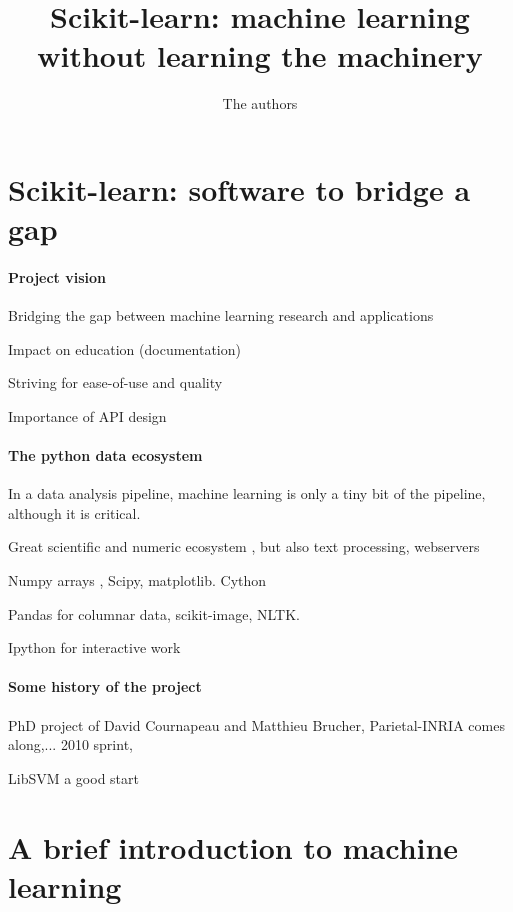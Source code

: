 \documentclass{article}
\begin{document}
\title{Scikit-learn: machine learning without learning the machinery}

\author{The authors}

\maketitle

\section{Scikit-learn: software to bridge a gap}

\paragraph{Project vision}
%
Bridging the gap between machine learning research and applications

\cite{pedregosa2011}

Impact on education (documentation)

Striving for ease-of-use and quality

Importance of API design \cite{buitinck2013ecml}

\paragraph{The python data ecosystem}
%
In a data analysis pipeline, machine learning is only a tiny bit of the
pipeline, although it is critical.

Great scientific and numeric ecosystem
\cite{oliphant2007python,varoquaux2013scipy}, but also text processing,
webservers

Numpy arrays \cite{vanderwalt2011}, Scipy, matplotlib. Cython
\cite{behnel2011cython}

Pandas for columnar data, scikit-image, NLTK.

Ipython for interactive work \cite{perez2007ipython}

\paragraph{Some history of the project}
%
PhD project of David Cournapeau and Matthieu Brucher, Parietal-INRIA
comes along,... 2010 sprint, 

LibSVM a good start
\cite{chang2011libsvm}

\section{A brief introduction to machine learning}
\end{document}

